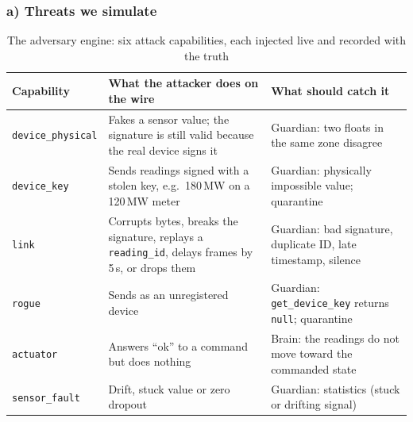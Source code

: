 \documentclass[10pt,a4paper]{article}
\begin{document}
\subsubsection{a) Threats we simulate}
\begin{table}[H]
\centering
\scriptsize
\renewcommand{\arraystretch}{0.92}
\caption{The adversary engine: six attack capabilities, each injected live and recorded with the truth}
\label{tab:threat_table}
\begin{tabularx}{\textwidth}{L{2.0cm}L{6.2cm}Y}
\toprule
\textbf{Capability} & \textbf{What the attacker does on the wire} & \textbf{What should catch it} \\
\midrule
\texttt{device\_physical} & Fakes a sensor value; the signature is still valid because the real device signs it & Guardian: two floats in the same zone disagree \\
\texttt{device\_key} & Sends readings signed with a stolen key, e.g.\ 180\,MW on a 120\,MW meter & Guardian: physically impossible value; quarantine \\
\texttt{link} & Corrupts bytes, breaks the signature, replays a \texttt{reading\_id}, delays frames by 5\,s, or drops them & Guardian: bad signature, duplicate ID, late timestamp, silence \\
\texttt{rogue} & Sends as an unregistered device & Guardian: \texttt{get\_device\_key} returns \texttt{null}; quarantine \\
\texttt{actuator} & Answers ``ok'' to a command but does nothing & Brain: the readings do not move toward the commanded state \\
\texttt{sensor\_fault} & Drift, stuck value or zero dropout & Guardian: statistics (stuck or drifting signal) \\
\bottomrule
\end{tabularx}
\end{table}
\end{document}

